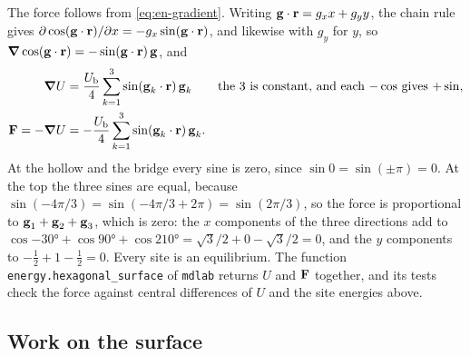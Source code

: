 The force follows from \cref{eq:en-gradient}. Writing $\bm{\mathrm{g}}\cdot\bm{\mathrm{r}} =
g_x x + g_y y$, the chain rule gives $\partial\cos(\bm{\mathrm{g}}\cdot\bm{\mathrm{r}})/
\partial x = -g_x\sin(\bm{\mathrm{g}}\cdot\bm{\mathrm{r}})$, and likewise with $g_y$ for
$y$, so $\bm{\nabla}\cos(\bm{\mathrm{g}}\cdot\bm{\mathrm{r}}) = -\sin(\bm{\mathrm{g}}\cdot\bm{\mathrm{r}})\,\bm{\mathrm{g}}$,
and
\begin{align*}
   \bm{\nabla} U &= \frac{U_{\mathrm b}}{4}\sum_{k=1}^{3}\sin(\bm{\mathrm{g}}_k\cdot\bm{\mathrm{r}})\,
      \bm{\mathrm{g}}_k
      && \text{the 3 is constant, and each $-\cos$ gives $+\sin$,}\\
   \bm{\mathrm{F}} = -\bm{\nabla} U &= -\frac{U_{\mathrm b}}{4}\sum_{k=1}^{3}
      \sin(\bm{\mathrm{g}}_k\cdot\bm{\mathrm{r}})\,\bm{\mathrm{g}}_k .
\end{align*}
At the hollow and the bridge every sine is zero, since $\sin 0 =
\sin(\pm\pi) = 0$. At the top the three sines are equal, because
$\sin(-4\pi/3) = \sin(-4\pi/3 + 2\pi) = \sin(2\pi/3)$, so the force is
proportional to $\bm{\mathrm{g}}_1 + \bm{\mathrm{g}}_2 + \bm{\mathrm{g}}_3$, which is zero: the $x$
components of the three directions add to $\cos\ang{-30} + \cos\ang{90} +
\cos\ang{210} = \sqrt3/2 + 0 - \sqrt3/2 = 0$, and the $y$ components to
$-\frac12 + 1 - \frac12 = 0$. Every site is an equilibrium. The function \texttt{energy.hexagonal\_surface} of
\texttt{mdlab} returns $U$ and $\bm{\mathrm{F}}$ together, and its tests check the
force against central differences of $U$ and the site energies above.

\subsection*{Work on the surface}

